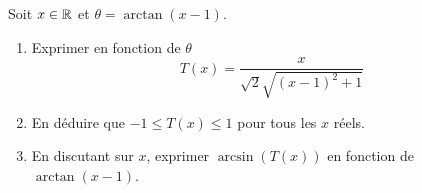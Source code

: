 Soit $x\in \mathbb{R}$ et $\theta = \arctan (x-1)$.
\begin{enumerate}
 \item Exprimer en fonction de $\theta$
\begin{displaymath}
 T(x) = \frac{x}{\sqrt{2}\sqrt{(x-1)^2 + 1}}
\end{displaymath}
\item En déduire que $-1 \leq T(x) \leq 1$ pour tous les $x$ réels.
\item En discutant sur $x$, exprimer $\arcsin(T(x))$ en fonction de $\arctan(x-1)$.
\end{enumerate}
